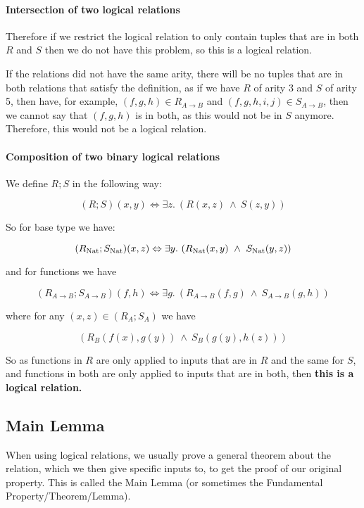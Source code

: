 \paragraph{Intersection of two logical relations}
Therefore if we restrict the logical relation to only contain tuples that are in both $R$ and $S$ then we do not have this problem, so this is a logical relation.

If the relations did not have the same arity, there will be no tuples that are in both relations that satisfy the definition, as if we have $R$ of arity 3 and $S$ of arity 5, then have, for example, $(f,g,h) \in R_{A \to B}$ and $(f,g,h,i,j) \in S_{A \to B}$, then we cannot say that $(f,g,h)$ is in both, as this would not be in $S$ anymore. Therefore, this would not be a logical relation.

\paragraph{Composition of two binary logical relations}
We define $R;S$ in the following way:

\[ (R;S)(x,y) \Leftrightarrow \exists z. \ (R(x,z) \ \wedge \ S(z,y))\]

So for base type we have:

\[ (R_{\operatorname{Nat}};S_{\operatorname{Nat}})(x,z) \Leftrightarrow \exists y. \ (R_{\operatorname{Nat}}(x,y) \ \wedge \ S_{\operatorname{Nat}}(y,z))\]

and for functions we have

\[ (R_{A \to B};S_{A \to B})(f,h) \Leftrightarrow \exists g. \ (R_{A \to B}(f,g) \ \wedge \ S_{A \to B}(g,h))\] 

where for any $(x,z) \in (R_A;S_A)$ we have

\[ (R_B(f(x),g(y)) \ \wedge \ S_B(g(y),h(z)))\] 

So as functions in $R$ are only applied to inputs that are in $R$ and the same for $S$, and functions in both are only applied to inputs that are in both, then \textbf{this is a logical relation.}

 

\subsection{Main Lemma}
When using logical relations, we usually prove a general theorem about the relation, which we then give specific inputs to, to get the proof of our original property. This is called the Main Lemma (or sometimes the Fundamental Property/Theorem/Lemma). %

